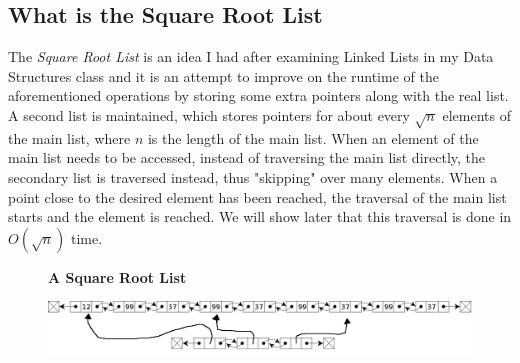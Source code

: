 \documentclass[10pt]{article}
\begin{document}
\subsection{What is the Square Root List}
The \textit{Square Root List} is an idea I had after examining Linked Lists in my Data Structures class and it is an attempt to improve on the runtime of the aforementioned operations by storing some extra pointers along with the real list. A second list is maintained, which stores pointers for about every $\sqrt{n}$ elements of the main list, where $n$ is the length of the main list. When an element of the main list needs to be accessed, instead of traversing the main list directly, the secondary list is traversed instead, thus "skipping" over many elements. When a point close to the desired element has been reached, the traversal of the main list starts and the element is reached. We will show later that this traversal is done in $O(\sqrt{n})$ time.
\begin{figure}[hbp]
	\centering
	\textbf{A Square Root List}\par\medskip
	\includegraphics[width=.7\textwidth]{./img/square_root_list.png}
\end{figure}
\end{document}
